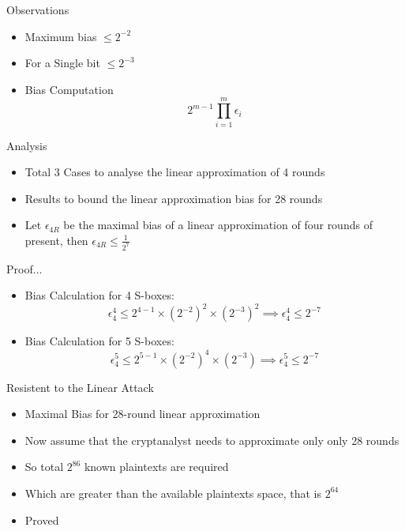 \begin{frame}{Observations}
\begin{itemize}
	\item Maximum bias $\leq2^{-2}$
	\item For a Single bit $\leq2^{-3}$
	\item Bias Computation \begin{equation*}
		2^{m-1}\prod_{i=1}^{m} \epsilon_i
	\end{equation*}
\end{itemize}
\end{frame}

\begin{frame}{Analysis}
\begin{itemize}
	\item Total 3 Cases to analyse the linear approximation of 4 rounds
	\item Results to bound the linear approximation bias for 28 rounds
	\item Let $\epsilon_{4R}$ be the maximal bias of a linear approximation of four
	rounds of present, then $\epsilon_{4R}\leq\frac{1}{2^7}$
\end{itemize}
\end{frame}

\begin{frame}{Proof$\ldots$}
	\begin{itemize}
		\item Bias Calculation for 4 S-boxes:
		\begin{equation*}
			\epsilon_4^{4} \leq 2^{4-1} \times (2^{-2})^2 \times (2^{-3})^2 \implies \epsilon_4^{4} \leq 2^{-7}
		\end{equation*}
		\item Bias Calculation for 5 S-boxes:
	    \begin{equation*}
	    	\epsilon_4^{5} \leq 2^{5-1} \times (2^{-2})^4 \times (2^{-3}) \implies \epsilon_4^{5} \leq 2^{-7}
	    \end{equation*}
	\end{itemize}
\end{frame}

\begin{frame}{Resistent to the Linear Attack}
	\begin{itemize}
		\item Maximal Bias for 28-round linear approximation
		\item Now assume that the cryptanalyst needs to approximate only only 28 rounds
		\item So total $2^{86}$ known plaintexts are required 
		\item Which are greater than the available plaintexts space, that is $2^{64}$
		\item Proved
	\end{itemize}
\end{frame}